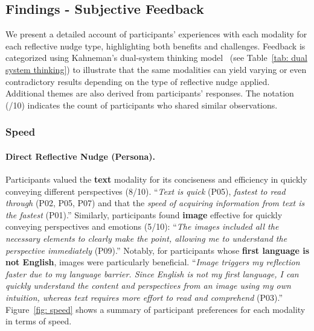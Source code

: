 \paragraph{}

\subsection{Findings - Subjective Feedback}
\label{sec: qualitative for study 1}
We present a detailed account of participants' experiences with each modality for each reflective nudge type, highlighting both benefits and challenges. Feedback is categorized using Kahneman’s dual-system thinking model~\cite{kahneman2002maps} (see Table~\ref{tab: dual system thinking}) to illustrate that the same modalities can yield varying or even contradictory results depending on the type of reflective nudge applied. Additional themes are also derived from participants' responses. The notation (/10) indicates the count of participants who shared similar observations.

\subsubsection{Speed}

\paragraph{Direct Reflective Nudge (Persona).} Participants valued the \textbf{text} modality for its conciseness and efficiency in quickly conveying different perspectives (8/10). ``\textit{Text is quick} (P05), \textit{fastest to read through} (P02, P05, P07) and that the \textit{speed of acquiring information from text is the fastest} (P01).'' Similarly, participants found \textbf{image} effective for quickly conveying perspectives and emotions (5/10):  ``\textit{The images included all the necessary elements to clearly make the point, allowing me to understand the perspective immediately} (P09).'' Notably, for participants whose \textbf{first language is not English}, images were particularly beneficial. ``\textit{Image triggers my reflection faster due to my language barrier. Since English is not my first language, I can quickly understand the content and perspectives from an image using my own intuition, whereas text requires more effort to read and comprehend} (P03).'' Figure~\ref{fig: speed} shows a summary of participant preferences for each modality in terms of speed.

